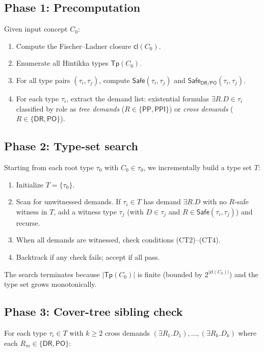 \documentclass[a4paper,11pt]{article}
\theoremstyle{definition}
\newcommand{\DR}{\ensuremath{\mathsf{DR}}}
\newcommand{\PO}{\ensuremath{\mathsf{PO}}}
\newcommand{\PP}{\ensuremath{\mathsf{PP}}}
\newcommand{\PPI}{\ensuremath{\mathsf{PPI}}}
\newcommand{\cl}{\ensuremath{\mathsf{cl}}}
\newcommand{\Tp}{\ensuremath{\mathsf{Tp}}}
\newcommand{\Safe}{\ensuremath{\mathsf{Safe}}}
\begin{document}
\subsection{Phase 1: Precomputation}

Given input concept $C_0$:
\begin{enumerate}[nosep]
  \item Compute the Fischer--Ladner closure $\cl(C_0)$.
  \item Enumerate all Hintikka types $\Tp(C_0)$.
  \item For all type pairs $(\tau_i, \tau_j)$, compute
    $\Safe(\tau_i, \tau_j)$ and
    $\Safe_{\DR/\PO}(\tau_i, \tau_j)$.
  \item For each type $\tau_i$, extract the demand list:
    existential formulas $\exists R.D \in \tau_i$ classified by
    role as \emph{tree demands} ($R \in \{\PP, \PPI\}$) or
    \emph{cross demands} ($R \in \{\DR, \PO\}$).
\end{enumerate}

\subsection{Phase 2: Type-set search}

Starting from each root type $\tau_0$ with $C_0 \in \tau_0$,
we incrementally build a type set $T$:
\begin{enumerate}[nosep]
  \item Initialize $T = \{\tau_0\}$.
  \item Scan for unwitnessed demands. If $\tau_i \in T$ has demand
    $\exists R.D$ with no $R$-safe witness in $T$, add a witness
    type $\tau_j$ (with $D \in \tau_j$ and $R \in \Safe(\tau_i,\tau_j)$)
    and recurse.
  \item When all demands are witnessed, check conditions
    (CT2)--(CT4).
  \item Backtrack if any check fails; accept if all pass.
\end{enumerate}

The search terminates because $|\Tp(C_0)|$ is finite (bounded
by $2^{|\cl(C_0)|}$) and the type set grows monotonically.

\subsection{Phase 3: Cover-tree sibling check}
\label{sec:sibling}

For each type $\tau_i \in T$ with $k \geq 2$ cross demands
$(\exists R_1.D_1), \ldots, (\exists R_k.D_k)$ where each
$R_m \in \{\DR, \PO\}$:
\end{document}
